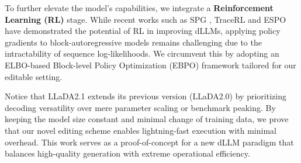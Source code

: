 To further elevate the model's capabilities, we integrate a \textbf{Reinforcement Learning (RL)} stage. While recent works such as SPG \citep{wang2025spg}, TraceRL \citep{wang2025revolutionizing} and ESPO \citep{ou_principled_2025} have demonstrated the potential of RL in improving dLLMs, applying policy gradients to block-autoregressive models remains challenging due to the intractability of sequence log-likelihoods. We circumvent this by adopting an ELBO-based Block-level Policy Optimization (EBPO) framework tailored for our editable setting. 

Notice that LLaDA2.1 extends its previous version (LLaDA2.0) by prioritizing decoding versatility over mere parameter scaling or benchmark peaking. By keeping the model size constant and minimal change of training data, we prove that our novel editing scheme enables lightning-fast execution with minimal overhead. This work serves as a proof-of-concept for a new dLLM paradigm that balances high-quality generation with extreme operational efficiency.

